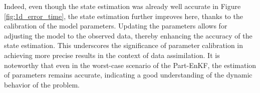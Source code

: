 Indeed, even though the state estimation was already well accurate in Figure \ref{fig:1d_error_time}, the state estimation further improves here, thanks to the calibration of the model parameters. Updating the parameters allows for adjusting the model to the observed data, thereby enhancing the accuracy of the state estimation. This underscores the significance of parameter calibration in achieving more precise results in the context of data assimilation.
It is noteworthy that even in the worst-case scenario of the Part-EnKF, the estimation of parameters remains accurate, indicating a good understanding of the dynamic behavior of the problem.

\newpage